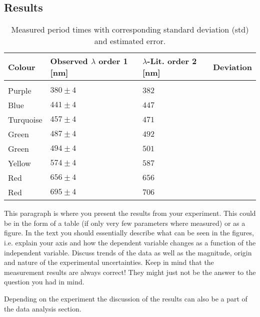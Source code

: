 \subsection{Results}

\begin{table}[ht]
	\begin{tabularx}{\textwidth}{XM{4cm}M{4cm}M{4cm}}%
		\toprule 
		\textbf{Colour}& \textbf{Observed $\lambda$ order 1}  [\si{\nano\m}]    & \textbf{$\lambda$-Lit. order 2} [\si{\nano\m}] & \textbf{Deviation}   \\
		\hline
		&&&\\[-5pt]
		Purple  	& $380 \pm 4$	& $382$ &  \\[5pt]
		Blue		& $441 \pm 4$	& $447$ &  \\[5pt]
		Turquoise 	& $457 \pm 4$	& $471$ &  \\[5pt]
		Green   	& $487 \pm 4$ 	& $492$ &  \\[5pt]
		Green		& $494 \pm 4$  	& $501$ &  \\[5pt]
		Yellow		& $574 \pm 4$  	& $587$	&  \\[5pt]
		Red			& $656 \pm 4$  	& $656$	&  \\[5pt]
		Red			& $695 \pm 4$  	& $706$	&  \\[5pt]
		\bottomrule 
	\end{tabularx}
	\caption{Measured period times with corresponding standard deviation (std) and estimated error.}
	\label{tab::period}
\end{table}

This paragraph is where you present the results from your
experiment. This could be in the form of a table (if only very few
parameters where measured) or as a figure. In the text you should
essentially describe what can be seen in the figures, i.e. explain
your axis and how the dependent variable changes as a function of
the independent variable. Discuss trends of the data as well as the
magnitude, origin and nature of the experimental uncertainties. Keep
in mind that the measurement results are always correct! They might
just not be the answer to the question you had in mind.

Depending on the experiment the discussion of the results can
also be a part of the data analysis section.